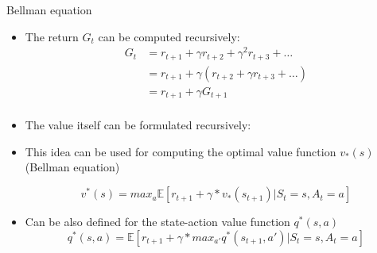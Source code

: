 \documentclass[presentation, 9pt]{beamer}\mode<presentation>{\usetheme{AMSBolognaFC}}
\begin{document}
\begin{frame}{Bellman equation}
	\begin{itemize}
		\item The return $G_t$ can be computed recursively:
		\begin{equation*}
			\begin{split}
				G_t & = r_{t+1} + \gamma r_{t+2} + \gamma^2 r_{t+3} + \dots \\
				& = r_{t+1} + \gamma (r_{t+2} + \gamma r_{t+3} + \dots) \\
				& = r_{t+1} + \gamma G_{t+1} \\
			\end{split}
		\end{equation*}
		\item The value itself can be formulated recursively: 
		\item This idea can be used for computing the optimal value function $v_*(s)$ (Bellman equation)
		
		\begin{equation*}
			v^*(s) = max_a \mathbb{E} [r_{t+1} + \gamma * v_*(s_{t+1}) | S_t = s, A_t = a]
		\end{equation*}
		\item Can be also defined for the state-action value function $q^*(s,a)$
		\begin{equation*}
			q^*(s, a) = \mathbb{E} [r_{t+1} + \gamma * max_{a'} q^*(s_{t+1}, a') | S_t = s, A_t = a]
		\end{equation*}
	\end{itemize}
\end{frame}
\end{document}
